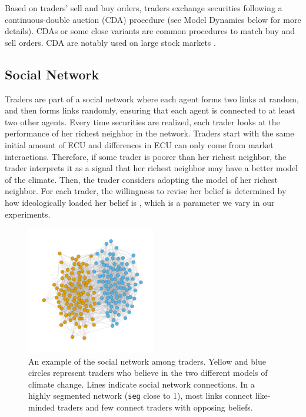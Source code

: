 \documentclass{article}\usepackage[]{graphicx}\usepackage[]{color}
\begin{document}
Based on traders' sell and buy orders, traders exchange securities following a continuous-double auction (CDA) procedure (see Model Dynamics below for more details). 
CDAs or some close variants are common procedures to match buy and sell orders. 
CDA are notably used on large stock markets .
 
\subsection{Social Network}

Traders are part of a social network where each agent forms two links at random, and then forms links randomly, ensuring that each agent is connected to at least two other agents. 
Every time securities are realized, each trader looks at the performance of her richest neighbor in the network. 
Traders start with the same initial amount of ECU and differences in ECU can only come from market interactions.
Therefore, if some trader is poorer than her richest neighbor, the trader interprets it as a signal that her richest neighbor may have a better model of the climate.
Then, the trader considers adopting the model of her richest neighbor. 
For each trader, the willingness to revise her belief is determined by how ideologically loaded her belief is , which is a parameter we vary in our experiments.

\begin{figure}[t]
\begin{center}
\includegraphics[width=0.50\textwidth]{network.pdf}
\caption{An example of the social network among traders. Yellow and blue circles represent traders who believe in the two different models of climate change. Lines indicate social network connections. In a highly segmented network (\texttt{seg} close to 1), most links connect like-minded traders and few connect traders with opposing beliefs.}\label{fig:social_network}%
\end{center}
\end{figure}
\end{document}
